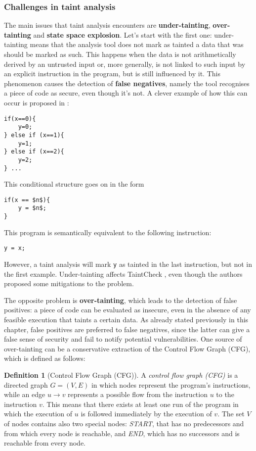 \documentclass[12pt,a4paper]{book}
\theoremstyle{definition}
\newtheorem{defn}{Definition}
\begin{document}
	\subsubsection{Challenges in taint analysis}
	The main issues that taint analysis encounters are \textbf{under-tainting}, \textbf{over-tainting} and \textbf{state space explosion}. Let's start with the first one: under-tainting means that the analysis tool does not mark as tainted a data that was should be marked as such. This happens when the data is not arithmetically derived by an untrusted input or, more generally, is not linked to such input by an explicit instruction in the program, but is still influenced by it. This phenomenon causes the detection of \textbf{false negatives}, namely the tool recognises a piece of code as secure, even though it's not. A clever example of how this can occur is proposed in \cite{Newsome2005}:
	\begin{lstlisting}
if(x==0){
	y=0;
} else if (x==1){
	y=1;
} else if (x==2){
	y=2;
} ...
	\end{lstlisting}
	This conditional structure goes on in the form
\begin{lstlisting}[mathescape=true]
if(x == $n$){
	y = $n$;
}
\end{lstlisting}
	This program is semantically equivalent to the following instruction:
	\begin{lstlisting}
y = x;
	\end{lstlisting}
	However, a taint analysis will mark \texttt{y} as tainted in the last instruction, but not in the first example. Under-tainting affects TaintCheck \cite{Newsome2005}, even though the authors proposed some mitigations to the problem.
	
	The opposite problem is \textbf{over-tainting}, which leads to the detection of false positives: a piece of code can be evaluated as insecure, even in the absence of any feasible execution that taints a certain data. As already stated previously in this chapter, false positives are preferred to false negatives, since the latter can give a false sense of security and fail to notify potential vulnerabilities. One source of over-tainting can be a conservative extraction of the Control Flow Graph (CFG), which is defined as follows:
	\begin{defn}[Control Flow Graph (CFG)]
		A \textit{control flow graph (CFG)} is a directed graph $G=(V,E)$ in which nodes represent the program's instructions, while an edge $u \rightarrow v$ represents a possible flow from the instruction $u$ to the instruction $v$. This means that there exists at least one run of the program in which the execution of $u$ is followed immediately by the execution of $v$. The set $V$ of nodes contains also two special nodes: \textit{START}, that has no predecessors and from which every node is reachable, and \textit{END}, which has no successors and is reachable from every node.
	\end{defn}
	
\end{document}
